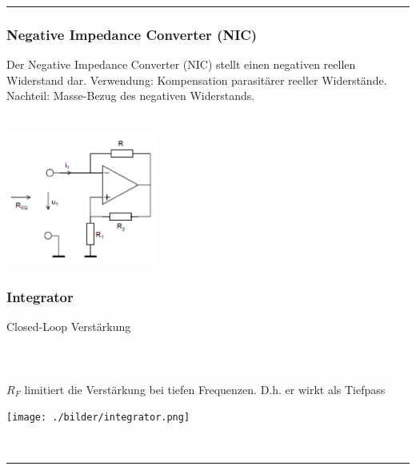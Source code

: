   \hrule 	 
  \subsubsection{Negative Impedance Converter (NIC)}
    \begin{minipage}[c]{12cm}    
      Der Negative Impedance Converter (NIC) stellt einen negativen reellen Widerstand
      dar. Verwendung: Kompensation parasitärer reeller Widerstände. \\
      Nachteil: Masse-Bezug des negativen Widerstands. \bigskip \\
      \\
    \end{minipage}
    \begin{minipage}[c]{5cm}
      \includegraphics[width=5cm]{./bilder/neg-imp-conv.png}
    \end{minipage}


  \subsubsection{Integrator}
    \begin{minipage}[T]{13cm}
      Closed-Loop Verst\"arkung
      \hspace{3mm}\\
      \hspace*{43mm}\\
      \hspace*{42mm} \\ \\
      $R_F$ limitiert die Verst\"arkung bei tiefen Frequenzen. D.h. er wirkt als Tiefpass
    \end{minipage} 
    \begin{minipage}{6cm}
      \texttt{[image: ./bilder/integrator.png]} 
    \end{minipage}\\		
\hrule

